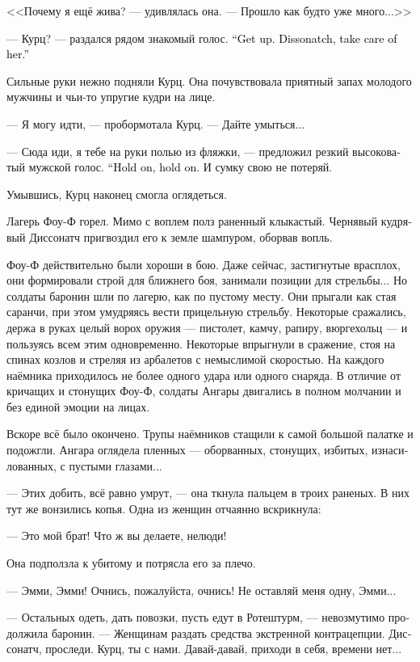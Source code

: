 \documentclass[a4paper,12pt,fleqn]{book}\usepackage{cooltooltips}\usepackage{polyglossia}\setdefaultlanguage[babelshorthands=true]{russian}\setotherlanguage{english}\defaultfontfeatures{Ligatures=TeX,Mapping=tex-text} \usepackage{xcolor}\definecolor{lightgray}{HTML}{bbbbbb}\color{lightgray}\newcommand{\ml}[3]{\textenglish{\textcolor{black}{#3}}}
\begin{document}
<<Почему я ещё жива? --- удивлялась она.
--- Прошло как будто уже много...>>

--- Курц? --- раздался рядом знакомый голос.
\ml{$0$}
{--- Вставай.}
{``Get up.}
\ml{$0$}
{Диссонатч, подержи её.}
{Dissonatch, take care of her.''}

Сильные руки нежно подняли Курц.
Она почувствовала приятный запах молодого мужчины и чьи-то упругие кудри на лице.

--- Я могу идти, --- пробормотала Курц.
--- Дайте умыться...

--- Сюда иди, я тебе на руки полью из фляжки, --- предложил резкий высоковатый мужской голос.
\ml{$0$}
{--- Держись, держись.}
{``Hold on, hold on.}
И сумку свою не потеряй.

Умывшись, Курц наконец смогла оглядеться.

Лагерь Фоу-Ф горел.
Мимо с воплем полз раненный клыкастый.
Чернявый кудрявый Диссонатч пригвоздил его к земле шампуром, оборвав вопль.

Фоу-Ф действительно были хороши в бою.
Даже сейчас, застигнутые врасплох, они формировали строй для ближнего боя, занимали позиции для стрельбы...
Но солдаты баронин шли по лагерю, как по пустому месту.
Они прыгали как стая саранчи, при этом умудряясь вести прицельную стрельбу.
Некоторые сражались, держа в руках целый ворох оружия --- пистолет, камчу, рапиру, вюргехольц --- и пользуясь всем этим одновременно.
Некоторые впрыгнули в сражение, стоя на спинах козлов и стреляя из арбалетов с немыслимой скоростью.
На каждого наёмника приходилось не более одного удара или одного снаряда.
В отличие от кричащих и стонущих Фоу-Ф, солдаты Ангары двигались в полном молчании и без единой эмоции на лицах.

Вскоре всё было окончено.
Трупы наёмников стащили к самой большой палатке и подожгли.
Ангара оглядела пленных --- оборванных, стонущих, избитых, изнасилованных, с пустыми глазами...

--- Этих добить, всё равно умрут, --- она ткнула пальцем в троих раненых.
В них тут же вонзились копья.
Одна из женщин отчаянно вскрикнула:

--- Это мой брат!
Что ж вы делаете, нелюди!

Она подползла к убитому и потрясла его за плечо.

--- Эмми, Эмми!
Очнись, пожалуйста, очнись!
Не оставляй меня одну, Эмми...

--- Остальных одеть, дать повозки, пусть едут в Ротештурм, --- невозмутимо продолжила баронин.
--- Женщинам раздать средства экстренной контрацепции.
Диссонатч, проследи.
Курц, ты с нами.
Давай-давай, приходи в себя, времени нет...
\end{document}

